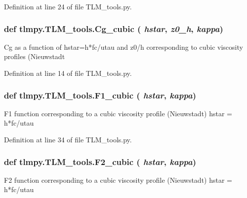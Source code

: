 Definition at line 24 of file TLM\_\-tools.py.\hypertarget{namespacetlmpy_1_1TLM__tools_ae33249db415ec555ccca9a38614cbefa}{
\subsubsection[{Cg\_\-cubic}]{\setlength{\rightskip}{0pt plus 5cm}def tlmpy.TLM\_\-tools.Cg\_\-cubic ( {\em hstar}, \/   {\em z0\_\-h}, \/   {\em kappa})}}
\label{namespacetlmpy_1_1TLM__tools_ae33249db415ec555ccca9a38614cbefa}
\begin{DoxyVerb}
Cg as a function of hstar=h*fc/utau and z0/h
corresponding to cubic viscosity profiles (Nieuwstadt
\end{DoxyVerb}
 

Definition at line 14 of file TLM\_\-tools.py.\hypertarget{namespacetlmpy_1_1TLM__tools_a8f7f47a2f001dada2bc0736f7030c765}{
\subsubsection[{F1\_\-cubic}]{\setlength{\rightskip}{0pt plus 5cm}def tlmpy.TLM\_\-tools.F1\_\-cubic ( {\em hstar}, \/   {\em kappa})}}
\label{namespacetlmpy_1_1TLM__tools_a8f7f47a2f001dada2bc0736f7030c765}
\begin{DoxyVerb}
F1 function corresponding to a cubic viscosity profile (Nieuwstadt)
hstar = h*fc/utau
\end{DoxyVerb}
 

Definition at line 34 of file TLM\_\-tools.py.\hypertarget{namespacetlmpy_1_1TLM__tools_a31232724f3f3be8294309471d36d3e9f}{
\subsubsection[{F2\_\-cubic}]{\setlength{\rightskip}{0pt plus 5cm}def tlmpy.TLM\_\-tools.F2\_\-cubic ( {\em hstar}, \/   {\em kappa})}}
\label{namespacetlmpy_1_1TLM__tools_a31232724f3f3be8294309471d36d3e9f}
\begin{DoxyVerb}
F2 function corresponding to a cubic viscosity profile (Nieuwstadt)
hstar = h*fc/utau
\end{DoxyVerb}
 

